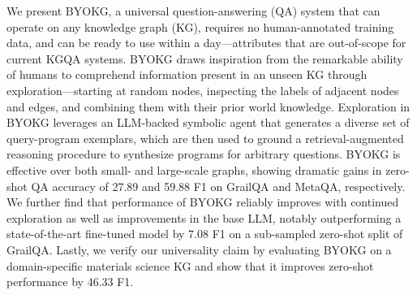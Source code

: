We present BYOKG, a universal question-answering (QA) system that can operate on any knowledge graph (KG), requires no human-annotated training data, and can be ready to use within a day---attributes that are out-of-scope for current KGQA systems. BYOKG draws inspiration from the remarkable ability of humans to comprehend information present in an unseen KG through exploration---starting at random nodes, inspecting the labels of adjacent nodes and edges, and combining them with their prior world knowledge. Exploration in BYOKG leverages an LLM-backed symbolic agent that generates a diverse set of query-program exemplars, which are then used to ground a retrieval-augmented reasoning procedure to synthesize programs for arbitrary questions. BYOKG is effective over both small- and large-scale graphs, showing dramatic gains in zero-shot QA accuracy of 27.89 and 59.88 F1 on GrailQA and MetaQA, respectively. We further find that performance of BYOKG reliably improves with continued exploration as well as improvements in the base LLM, notably outperforming a state-of-the-art fine-tuned model by 7.08 F1 on a sub-sampled zero-shot split of GrailQA. Lastly, we verify our universality claim by evaluating BYOKG on a domain-specific materials science KG and show that it improves zero-shot performance by 46.33 F1.